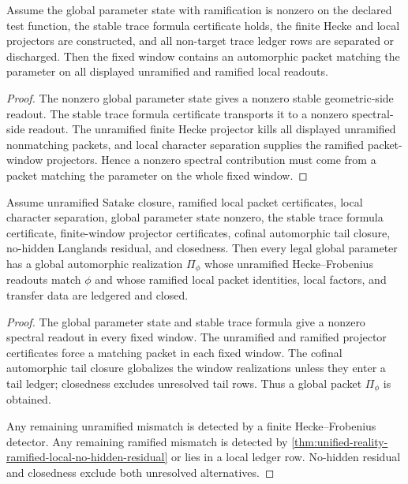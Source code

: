 \begin{theorem}
\label{thm:unified-reality-ramified-parameter-state-trace-realization}
Assume the global parameter state with ramification is nonzero on the
declared test function, the stable trace formula certificate holds, the
finite Hecke and local projectors are constructed, and all non-target
trace ledger rows are separated or discharged. Then the fixed window
contains an automorphic packet matching the parameter on all displayed
unramified and ramified local readouts.
\end{theorem}
\begin{proof}
The nonzero global parameter state gives a nonzero stable geometric-side
readout. The stable trace formula certificate transports it to a nonzero
spectral-side readout. The unramified finite Hecke projector kills all
displayed unramified nonmatching packets, and local character separation
supplies the ramified packet-window projectors. Hence a nonzero spectral
contribution must come from a packet matching the parameter on the whole
fixed window.
\end{proof}

\begin{theorem}
\label{thm:unified-reality-ramified-bedc-langlands-closure}
Assume unramified Satake closure, ramified local packet certificates,
local character separation, global parameter state nonzero, the stable
trace formula certificate, finite-window projector certificates, cofinal
automorphic tail closure, no-hidden Langlands residual, and closedness.
Then every legal global parameter has a global automorphic realization
$\Pi_\phi$ whose unramified Hecke--Frobenius readouts match $\phi$ and
whose ramified local packet identities, local factors, and transfer data
are ledgered and closed.
\end{theorem}
\begin{proof}
The global parameter state and stable trace formula give a nonzero
spectral readout in every fixed window. The unramified and ramified
projector certificates force a matching packet in each fixed window.
The cofinal automorphic tail closure globalizes the window realizations
unless they enter a tail ledger; closedness excludes unresolved tail
rows. Thus a global packet $\Pi_\phi$ is obtained.

Any remaining unramified mismatch is detected by a finite
Hecke--Frobenius detector. Any remaining ramified mismatch is detected by
\autoref{thm:unified-reality-ramified-local-no-hidden-residual} or lies
in a local ledger row. No-hidden residual and closedness exclude both
unresolved alternatives.
\end{proof}

